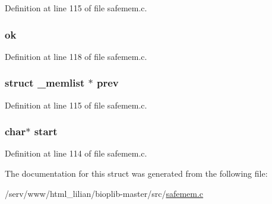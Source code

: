 Definition at line 115 of file safemem.\-c.

\hypertarget{struct__memlist_ab89bc11c843f92ea91cc97d33f20d72c}{
\subsubsection[{ok}]{ ok}}\label{struct__memlist_ab89bc11c843f92ea91cc97d33f20d72c}


Definition at line 118 of file safemem.\-c.

\hypertarget{struct__memlist_ad18781e89269318ca9b53b1f673056c3}{
\subsubsection[{prev}]{\setlength{\rightskip}{0pt plus 5cm}struct {\bf \-\_\-memlist} $\ast$ prev}}\label{struct__memlist_ad18781e89269318ca9b53b1f673056c3}


Definition at line 115 of file safemem.\-c.

\hypertarget{struct__memlist_ab40328f79e021050ac262dc0a6019667}{
\subsubsection[{start}]{\setlength{\rightskip}{0pt plus 5cm}char$\ast$ start}}\label{struct__memlist_ab40328f79e021050ac262dc0a6019667}


Definition at line 114 of file safemem.\-c.



The documentation for this struct was generated from the following file\-:\begin{DoxyCompactItemize}
\item 
/serv/www/html\-\_\-lilian/bioplib-\/master/src/\hyperlink{safemem_8c}{safemem.\-c}\end{DoxyCompactItemize}
